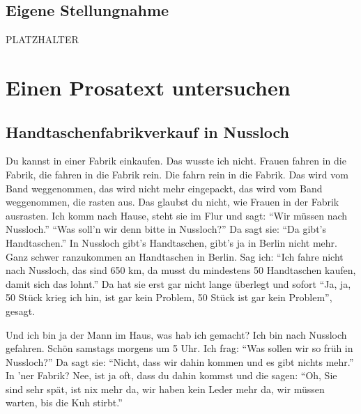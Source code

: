 \documentclass[12pt,a4paper]{scrartcl}
\begin{document}
\subsection{Eigene Stellungnahme} 
PLATZHALTER


\section{Einen Prosatext untersuchen}
\modulolinenumbers[5]
\begin{linenumbers}
\subsection*{Handtaschenfabrikverkauf in Nussloch}
Du kannst in einer Fabrik einkaufen. Das wusste ich nicht. Frauen fahren in die Fabrik, die fahren in die Fabrik rein. Die fahrn rein in die Fabrik. Das wird vom Band weggenommen, das wird nicht mehr eingepackt, das wird vom Band weggenommen, die rasten aus. Das glaubst du nicht, wie Frauen in der Fabrik ausrasten. Ich komm nach Hause, steht sie im Flur und sagt: "`Wir müssen nach Nussloch."' "`Was soll'n wir denn bitte in Nussloch?"'  Da sagt sie: "`Da gibt's Handtaschen."' In Nussloch gibt's Handtaschen, gibt's ja in Berlin nicht mehr. Ganz schwer ranzukommen an Handtaschen in Berlin. Sag ich: "`Ich fahre nicht nach Nussloch, das sind 650 km, da musst du mindestens 50 Handtaschen kaufen, damit sich das lohnt."'  Da hat sie erst gar nicht lange überlegt und sofort "`Ja, ja, 50 Stück krieg ich hin, ist gar kein Problem, 50 Stück ist gar kein Problem"', gesagt.

Und ich bin ja der Mann im Haus, was hab ich gemacht? Ich bin nach Nussloch gefahren. Schön samstags morgens um 5 Uhr. Ich frag: "`Was sollen wir so früh in Nussloch?"' Da sagt sie: "`Nicht, dass wir dahin kommen und es gibt nichts mehr."' In 'ner Fabrik? Nee, ist ja oft, dass du dahin kommst und die sagen: "`Oh, Sie sind sehr spät, ist nix mehr da, wir haben kein Leder mehr da, wir müssen warten, bis die Kuh stirbt."'


\end{linenumbers}
\end{document}
